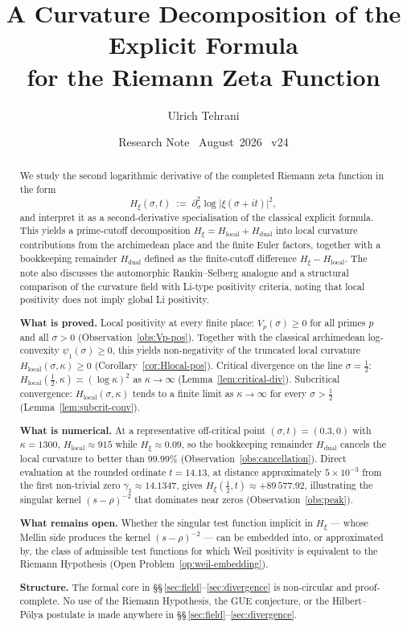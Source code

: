 \documentclass[11pt]{article}
\title{\vspace{-1.5em}\bfseries
A Curvature Decomposition of the Explicit Formula\\[0.4em]
\large for the Riemann Zeta Function}
\author{Ulrich Tehrani}
\date{Research Note \textperiodcentered\ August~2026
      \textperiodcentered\ v24}
\newcommand{\Hxi}{H_{\xi}}
\newcommand{\Hlocal}{H_{\mathrm{local}}}
\newcommand{\Hdual}{H_{\mathrm{dual}}}
\begin{document}
\maketitle

\begin{abstract}
We study the second logarithmic derivative of the completed
Riemann zeta function in the form
\[
\Hxi(\sigma,t)\;:=\;\partial_{\sigma}^{2}\log
\lvert\xi(\sigma+it)\rvert^{2},
\]
and interpret it as a second-derivative specialisation of the
classical explicit formula. This yields a prime-cutoff
decomposition $\Hxi=\Hlocal+\Hdual$ into local curvature
contributions from the archimedean place and the finite Euler
factors, together with a bookkeeping remainder $\Hdual$
defined as the finite-cutoff difference $\Hxi-\Hlocal$.
The note also discusses the automorphic Rankin--Selberg
analogue and a structural comparison of the curvature field
with Li-type positivity criteria, noting that local positivity
does not imply global Li positivity.

\textbf{What is proved.}
Local positivity at every finite place: $V_p(\sigma)\ge 0$ for
all primes $p$ and all $\sigma>0$ (Observation~\ref{obs:Vp-pos}).
Together with the classical archimedean log-convexity
$\psi_1(\sigma)\ge 0$, this yields non-negativity of the
truncated local curvature $\Hlocal(\sigma,\kappa)\ge 0$
(Corollary~\ref{cor:Hlocal-pos}).
Critical divergence on the line $\sigma=\tfrac12$:
$\Hlocal(\tfrac12,\kappa)\asymp(\log\kappa)^{2}$ as
$\kappa\to\infty$ (Lemma~\ref{lem:critical-div}).
Subcritical convergence: $\Hlocal(\sigma,\kappa)$ tends to a
finite limit as $\kappa\to\infty$ for every $\sigma>\tfrac12$
(Lemma~\ref{lem:subcrit-conv}).

\textbf{What is numerical.}
At a representative off-critical point $(\sigma,t)=(0.3,0)$
with $\kappa=1300$, $\Hlocal\approx 915$ while
$\Hxi\approx 0.09$, so the bookkeeping remainder $\Hdual$
cancels the local curvature to better than $99.99\%$
(Observation~\ref{obs:cancellation}).
Direct evaluation at the rounded ordinate $t=14.13$, at
distance approximately $5\times 10^{-3}$ from the first
non-trivial zero $\gamma_1\approx 14.1347$, gives
$\Hxi(\tfrac12,t)\approx +89\,577.92$, illustrating the
singular kernel $(s-\rho)^{-2}$ that dominates near zeros
(Observation~\ref{obs:peak}).

\textbf{What remains open.}
Whether the singular test function implicit in $\Hxi$ ---
whose Mellin side produces the kernel $(s-\rho)^{-2}$ --- can
be embedded into, or approximated by, the class of admissible
test functions for which Weil positivity is equivalent to the
Riemann Hypothesis (Open Problem~\ref{op:weil-embedding}).

\textbf{Structure.}
The formal core in
\S\S\,\ref{sec:field}--\ref{sec:divergence} is non-circular
and proof-complete.
No use of the Riemann Hypothesis, the GUE conjecture, or the
Hilbert--P\'olya postulate is made anywhere in
\S\S\,\ref{sec:field}--\ref{sec:divergence}.
\end{abstract}
\end{document}
